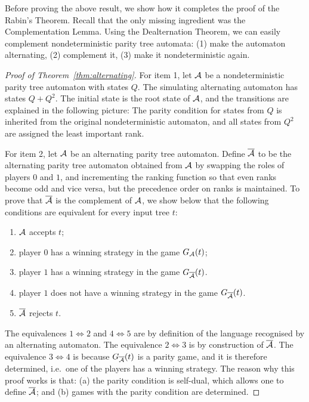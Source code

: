 Before proving the above result, we show how it completes the proof of the Rabin's Theorem. Recall that the only missing ingredient was the Complementation Lemma. Using the Dealternation Theorem, we can easily complement nondeterministic parity tree automata: (1) make the automaton alternating, (2) complement it, (3) make it nondeterministic again.

\begin{proof}[Proof of Theorem~\ref{thm:alternating}]
For item 1, let $\mathcal{A}$ be a nondeterministic parity tree automaton with states $Q$. The simulating alternating automaton has states $Q + Q^2$. The initial state is the root state of $\mathcal{A}$, and the transitions are explained in the following picture: 
 The  parity condition for states from $Q$ is inherited from the original nondeterministic automaton, and all states from $Q^2$ are assigned the least important rank. 

For item 2, let $\mathcal{A}$ be an alternating parity tree automaton. Define $\overline{\mathcal{A}}$ to be the alternating parity tree automaton obtained from $\mathcal{A}$ by swapping the roles of players $0$ and $1$, and incrementing the ranking function so that even ranks become odd and vice versa, but the precedence order on ranks is maintained. To prove that $\overline{\mathcal{A}}$ is the complement of $\mathcal{A}$, we show below that the following conditions are equivalent for every input tree $t$:
\begin{enumerate}
\item $\mathcal{A}$ accepts $t$;
	\item player $0$ has a winning strategy in the game $G_{\mathcal{A}}(t)$;
	\item player $1$ has a winning strategy in the game $G_{\overline{\mathcal{A}}}(t)$. 
 	\item player $1$ does not have a winning strategy in the game $G_{\overline{\mathcal{A}}}(t)$. 
 	\item $\overline{\mathcal{A}}$ rejects $t$.
\end{enumerate}
The equivalences $1 \Leftrightarrow 2$ and $4 \Leftrightarrow 5$ are by definition of the language recognised by an alternating automaton. The equivalence $2 \Leftrightarrow 3$ is by construction of $\overline{\mathcal{A}}$. The equivalence $3 \Leftrightarrow 4$ is because  $G_{\overline{\mathcal{A}}}(t)$ is a parity game, and it is therefore  determined, i.e.~one of the players has a winning strategy. The reason why this proof works is that: (a) the parity condition is self-dual, which allows one to define $\overline{\mathcal{A}}$; and (b) games with the parity condition are determined.


\end{proof}
